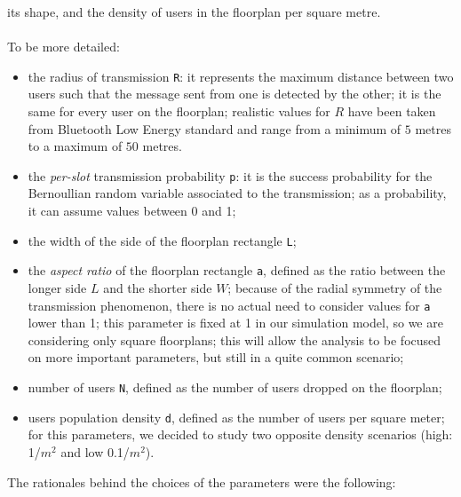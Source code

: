 its shape, and the density of users in the floorplan per square metre.\\
\\
To be more detailed:
\begin{itemize}
	\item the radius of transmission \colorbox{gray!30}{\large \texttt{R}}: it
	represents the maximum distance between two users such that the message
	sent from one is detected by the other; it is the same for every user on
	the floorplan; realistic values for $R$ have been taken from Bluetooth Low
	Energy standard and range from a minimum of $5$ metres to a maximum of $50$
	metres.
	\item the \textit{per-slot} transmission probability
	\colorbox{gray!30}{\large \texttt{p}}: it is the success probability for the
	Bernoullian random variable associated to the transmission; as a
	probability, it can assume values between 0 and 1;
    \item the width of the side of the floorplan rectangle
    \colorbox{gray!30}{\large \texttt{L}};
	\item the \textit{aspect ratio} of the floorplan rectangle
	\colorbox{gray!30}{\large \texttt{a}}, defined as the ratio between the
	longer side $L$ and the shorter side $W$; because of the radial symmetry of
	the transmission phenomenon, there is no actual need to consider values for
	\texttt{a} lower than 1; this parameter is fixed at 1 in our simulation model, 
	so we are considering only square floorplans; this will allow the analysis
	to be focused on more important parameters, but still in a quite common
	scenario;
	\item number of users \colorbox{gray!30}{\large \texttt{N}}, defined
	as the number of users dropped on the floorplan;
	\item users population density \colorbox{gray!30}{\large \texttt{d}},
	defined as the number of users per square meter; for this parameters, we
	decided to study two opposite density scenarios
	(high: 1/$m^2$ and low 0.1/$m^2$).
\end{itemize}
The rationales behind the choices of the parameters were the following:

